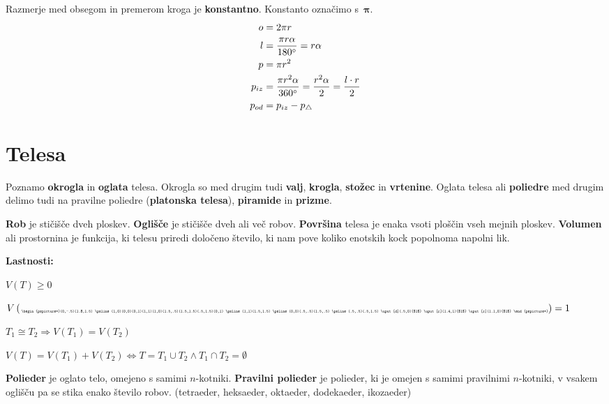 \documentclass[a4paper,oneside,12pt,fleqn]{article}
\newcommand\krat\cdot
\def\deg{\degree}
\renewcommand\implies\Rightarrow
\renewcommand\iff\Leftrightarrow
\numberwithin{equation}{section}
\newenvironment{itemize*}%
{
\vspace{-12pt}%
\begin{itemize}%
\setlength{\itemsep}{0pt}%
\setlength{\parskip}{2pt}}%
{\end{itemize}}
\begin{document}
Razmerje med obsegom in premerom kroga je \textbf{konstantno}. Konstanto označimo s~$\boldsymbol\pi$.
\begin{align*}
  o &= 2\pi r \\
  l &= \frac{\pi r\alpha}{180\deg} = r\alpha \\
  p &= \pi r^2 \\
  p_{iz} &= \frac{\pi r^2\alpha}{360\deg} = \frac{r^2\alpha}{2} = \frac{l\krat
  r}{2} \\
  p_{od} &= p_{iz} - p_{\triangle}
\end{align*}

\section{Telesa}
\label{sec:tel}
Poznamo \textbf{okrogla} in \textbf{oglata} telesa. Okrogla so med drugim tudi
\textbf{valj}, \textbf{krogla}, \textbf{stožec} in
\textbf{vrtenine}. Oglata telesa ali \textbf{poliedre} med drugim delimo tudi na pravilne poliedre
(\textbf{platonska telesa}), \textbf{piramide} in \textbf{prizme}.

\textbf{Rob} je stičišče dveh ploskev. \textbf{Oglišče} je stičišče dveh ali več robov.
\textbf{Površina} telesa je enaka vsoti ploščin vseh mejnih ploskev. 
\textbf{Volumen} ali prostornina je funkcija, ki telesu
priredi določeno število, ki nam pove koliko enotskih kock popolnoma napolni lik.

\textbf{Lastnosti:}
\begin{itemize*}
  \item $V(T) \ge 0$
  \item $V\left(
    \raisebox{-.4\height}{\scalebox{0.4}{
    \begin{pspicture*}(0,-.5)(1.8,1.5)
      \psline(1,0)(0,0)(0,1)(1,1)(1,0)(1.5,.5)(1.5,1.5)(.5,1.5)(0,1)
      \psline(1,1)(1.5,1.5)
      \psline(0,0)(.5,.5)(1.5,.5)
      \psline(.5,.5)(.5,1.5)
      \uput[d](.5,0){$1$}
      \uput[r](1.4,1){$1$}
      \uput[r](1.1,0){$1$}
    \end{pspicture*}}}\right) = 1$
  \item $T_1 \cong T_2 \implies V(T_1) = V(T_2)$
  \item $V(T) = V(T_1) + V(T_2) \iff T = T_1 \cup T_2 \land T_1 \cap T_2 = \emptyset$
\end{itemize*}

\textbf{Polieder} je oglato telo, omejeno s samimi $n$-kotniki.
\textbf{Pravilni polieder} je polieder, ki je omejen s samimi pravilnimi $n$-kotniki, v vsakem
oglišču pa se stika enako število robov. (tetraeder, heksaeder, oktaeder, dodekaeder,
ikozaeder)
\end{document}
